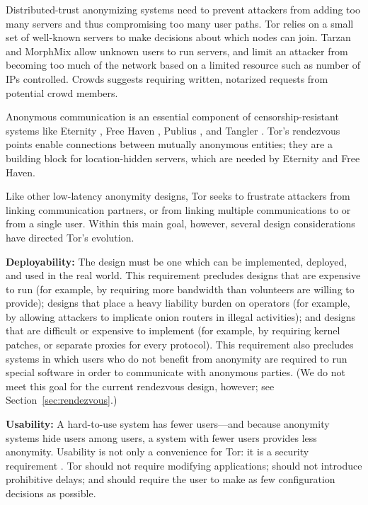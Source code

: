 \documentclass[times,10pt,twocolumn]{article}
\begin{document}
Distributed-trust anonymizing systems need to prevent attackers from
adding too many servers and thus compromising too many user paths.
Tor relies on a small set of well-known servers to make
decisions about which nodes can join. Tarzan
and MorphMix allow unknown users to run servers, and limit an attacker
from becoming too much of the network based on a limited resource such
as number of IPs controlled. Crowds suggests requiring written, notarized
requests from potential crowd members.

Anonymous communication is an essential component of censorship-resistant
systems like Eternity \cite{eternity}, Free Haven \cite{freehaven-berk},
Publius \cite{publius}, and Tangler \cite{tangler}. Tor's rendezvous
points enable connections between mutually anonymous entities; they
are a building block for location-hidden servers, which are needed by
Eternity and Free Haven.


\label{sec:assumptions}

Like other low-latency anonymity designs, Tor seeks to frustrate
attackers from linking communication partners, or from linking
multiple communications to or from a single user.  Within this
main goal, however, several design considerations have directed
Tor's evolution.

\textbf{Deployability:} The design must be one which can be implemented,
deployed, and used in the real world.  This requirement precludes designs
that are expensive to run (for example, by requiring more bandwidth
than volunteers are willing to provide); designs that place a heavy
liability burden on operators (for example, by allowing attackers to
implicate onion routers in illegal activities); and designs that are
difficult or expensive to implement (for example, by requiring kernel
patches, or separate proxies for every protocol).  This requirement also
precludes systems in which users who do not benefit from anonymity are
required to run special software in order to communicate with anonymous
parties. (We do not meet this goal for the current rendezvous design,
however; see Section~\ref{sec:rendezvous}.)

\textbf{Usability:} A hard-to-use system has fewer users---and because
anonymity systems hide users among users, a system with fewer users
provides less anonymity.  Usability is not only a convenience for Tor:
it is a security requirement \cite{econymics,back01}. Tor should not
require modifying applications; should not introduce prohibitive delays;
and should require the user to make as few configuration decisions
as possible.
\end{document}
